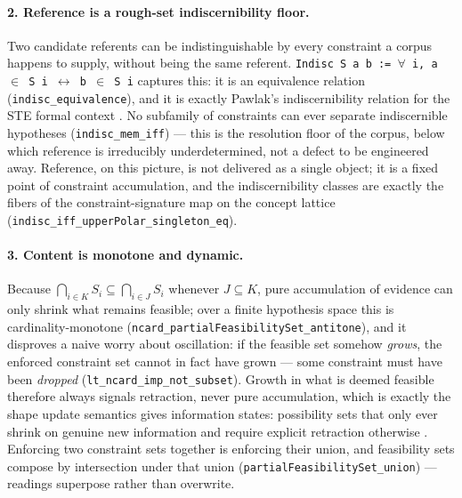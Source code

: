 \documentclass[11pt]{article}
\newcommand{\code}[1]{\texttt{#1}}
\begin{document}
\paragraph{2. Reference is a rough-set indiscernibility floor.}
Two candidate referents can be indistinguishable by every constraint a
corpus happens to supply, without being the same referent. \code{Indisc
S a b := \ensuremath{\forall} i, a \ensuremath{\in} S i \ensuremath{\leftrightarrow} b
\ensuremath{\in} S i} captures this: it is an equivalence relation
(\code{indisc\_equivalence}), and it is exactly Pawlak's
indiscernibility relation for the STE formal context
\citep{pawlak1982rough}. No subfamily of constraints can ever separate
indiscernible hypotheses (\code{indisc\_mem\_iff}) --- this is the
resolution floor of the corpus, below which reference is irreducibly
underdetermined, not a defect to be engineered away. Reference, on this
picture, is not delivered as a single object; it is a fixed point of
constraint accumulation, and the indiscernibility classes are exactly
the fibers of the constraint-signature map on the concept lattice
(\code{indisc\_iff\_upperPolar\_singleton\_eq}).

\paragraph{3. Content is monotone and dynamic.}
Because $\bigcap_{i \in K} S_i \subseteq \bigcap_{i \in J} S_i$
whenever $J \subseteq K$, pure accumulation of evidence can only shrink
what remains feasible; over a finite hypothesis space this is
cardinality-monotone
(\code{ncard\_partialFeasibilitySet\_antitone}), and it disproves a
naive worry about oscillation: if the feasible set somehow
\emph{grows}, the enforced constraint set cannot in fact have grown ---
some constraint must have been \emph{dropped}
(\code{lt\_ncard\_imp\_not\_subset}). Growth in what is deemed feasible
therefore always signals retraction, never pure accumulation, which is
exactly the shape update semantics gives information states: possibility
sets that only ever shrink on genuine new information and require
explicit retraction otherwise \citep{veltman1996defaults}. Enforcing two
constraint sets together is enforcing their union, and feasibility sets
compose by intersection under that union
(\code{partialFeasibilitySet\_union}) --- readings superpose rather
than overwrite.
\end{document}
